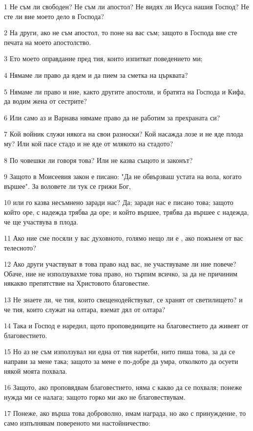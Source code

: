 \par 1 Не съм ли свободен? Не съм ли апостол? Не видях ли Исуса нашия Господ? Не сте ли вие моето дело в Господа?
\par 2 На други, ако не съм апостол, то поне на вас съм; защото в Господа вие сте печата на моето апостолство.
\par 3 Ето моето оправдание пред тия, които изпитват поведението ми;
\par 4 Нямаме ли право да ядем и да пием за сметка на църквата?
\par 5 Нямаме ли право и ние, както другите апостоли, и братята на Господа и Кифа, да водим жена от сестрите?
\par 6 Или само аз и Варнава нямаме право да не работим за прехраната си?
\par 7 Кой войник служи някога на свои разноски? Кой насажда лозе и не яде плода му? Или кой пасе стадо и не яде от млякото на стадото?
\par 8 По човешки ли говоря това? Или не казва същото и законът?
\par 9 Защото в Моисеевия закон е писано: "Да не обвързваш устата на вола, когато вършее". За воловете ли тук се грижи Бог,
\par 10 или го казва несъмнено заради нас? Да; заради нас е писано това; защото който оре, с надежда трябва да оре; и който вършее, трябва да вършее с надежда, че ще участвува в плода.
\par 11 Ако ние сме посяли у вас духовното, голямо нещо ли е , ако пожънем от вас телесното?
\par 12 Ако други участвуват в това право над вас, не участвуваме ли ние повече? Обаче, ние не използувахме това право, но търпим всичко, за да не причиним някакво препятствие на Христовото благовестие.
\par 13 Не знаете ли, че тия, които свещенодействуват, се хранят от светилището? и че тия, които служат на олтара, вземат дял от олтара?
\par 14 Така и Господ е наредил, щото проповедниците на благовестието да живеят от благовестието.
\par 15 Но аз не съм използувал ни една от тия наретби, нито пиша това, за да се направи за мене така; защото за мене е по-добре да умра, отколкото да осуети някой моята похвала.
\par 16 Защото, ако проповядвам благовестието, няма с какво да се похваля; понеже нужда ми се налага; защото горко ми ако не благовествувам.
\par 17 Понеже, ако върша това доброволно, имам награда, но ако с принуждение, то само изпълнявам повереното ми настойничество:
